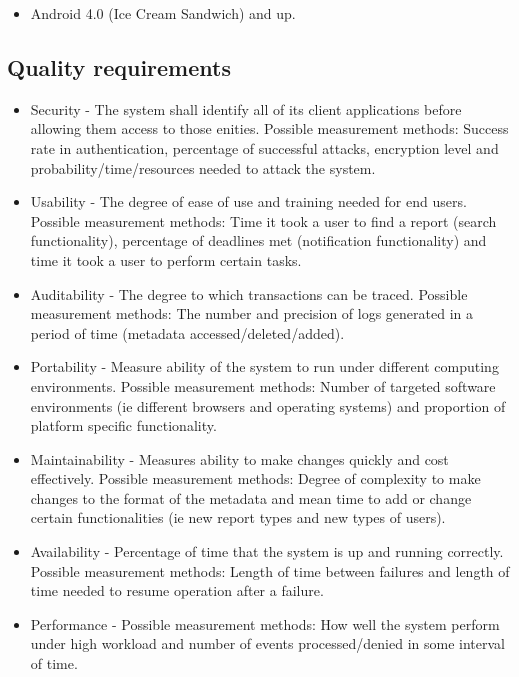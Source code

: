 \documentclass[11pt]{article}
\begin{document}
	\begin{itemize}
		\item Android 4.0 (Ice Cream Sandwich) and up.
	\end{itemize}
	
	\subsection{Quality requirements}
	
	\begin{itemize}
		\item Security - The system shall identify all of its client applications before allowing them access to those enities. Possible measurement methods: Success rate in authentication, percentage of successful attacks, encryption level and probability/time/resources needed to attack the system.
		\item Usability - The degree of ease of use and training needed for end users. Possible measurement methods: Time it took a user to find a report (search functionality), percentage of deadlines met (notification functionality) and time it took a user to perform certain tasks.
		\item Auditability - The degree to which transactions can be traced. Possible measurement methods: The number and precision of logs generated in a period of time (metadata accessed/deleted/added).
		\item Portability - Measure ability of the system to run under different computing environments. Possible measurement methods: Number of targeted software environments (ie different browsers and operating systems) and proportion of platform specific functionality.
		\item Maintainability - Measures ability to make changes quickly and cost effectively. Possible measurement methods: Degree of complexity to make changes to the format of the metadata and mean time to add or change certain functionalities (ie new report types and new types of users).
		\item Availability - Percentage of time that the system is up and running correctly. Possible measurement methods: Length of time between failures and length of time needed to resume operation after a failure.
		\item Performance - Possible measurement methods: How well the system perform under high workload and number of events processed/denied in some interval of time.
	\end{itemize}
	
\end{document}
